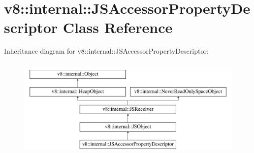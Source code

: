 \hypertarget{classv8_1_1internal_1_1JSAccessorPropertyDescriptor}{}\section{v8\+:\+:internal\+:\+:J\+S\+Accessor\+Property\+Descriptor Class Reference}
\label{classv8_1_1internal_1_1JSAccessorPropertyDescriptor}
Inheritance diagram for v8\+:\+:internal\+:\+:J\+S\+Accessor\+Property\+Descriptor\+:\begin{figure}[H]
\begin{center}
\leavevmode
\includegraphics[height=5.000000cm]{classv8_1_1internal_1_1JSAccessorPropertyDescriptor}
\end{center}
\end{figure}
